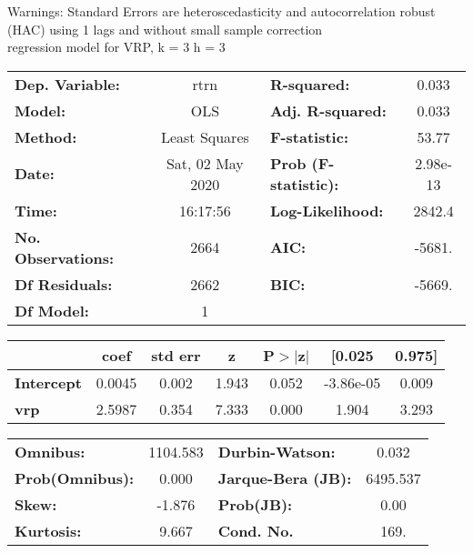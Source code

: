 Warnings: \newline
 [1] Standard Errors are heteroscedasticity and autocorrelation robust (HAC) using 1 lags and without small sample correction\\ 

regression model for VRP, k = 3 h = 3\begin{center}
\begin{tabular}{lclc}
\toprule
\textbf{Dep. Variable:}    &       rtrn       & \textbf{  R-squared:         } &     0.033   \\
\textbf{Model:}            &       OLS        & \textbf{  Adj. R-squared:    } &     0.033   \\
\textbf{Method:}           &  Least Squares   & \textbf{  F-statistic:       } &     53.77   \\
\textbf{Date:}             & Sat, 02 May 2020 & \textbf{  Prob (F-statistic):} &  2.98e-13   \\
\textbf{Time:}             &     16:17:56     & \textbf{  Log-Likelihood:    } &    2842.4   \\
\textbf{No. Observations:} &        2664      & \textbf{  AIC:               } &    -5681.   \\
\textbf{Df Residuals:}     &        2662      & \textbf{  BIC:               } &    -5669.   \\
\textbf{Df Model:}         &           1      & \textbf{                     } &             \\
\bottomrule
\end{tabular}
\begin{tabular}{lcccccc}
                   & \textbf{coef} & \textbf{std err} & \textbf{z} & \textbf{P$> |$z$|$} & \textbf{[0.025} & \textbf{0.975]}  \\
\midrule
\textbf{Intercept} &       0.0045  &        0.002     &     1.943  &         0.052        &    -3.86e-05    &        0.009     \\
\textbf{vrp}       &       2.5987  &        0.354     &     7.333  &         0.000        &        1.904    &        3.293     \\
\bottomrule
\end{tabular}
\begin{tabular}{lclc}
\textbf{Omnibus:}       & 1104.583 & \textbf{  Durbin-Watson:     } &    0.032  \\
\textbf{Prob(Omnibus):} &   0.000  & \textbf{  Jarque-Bera (JB):  } & 6495.537  \\
\textbf{Skew:}          &  -1.876  & \textbf{  Prob(JB):          } &     0.00  \\
\textbf{Kurtosis:}      &   9.667  & \textbf{  Cond. No.          } &     169.  \\
\bottomrule
\end{tabular}
\end{center}

